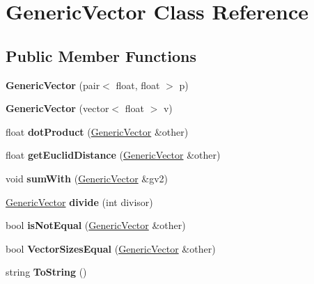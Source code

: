 \hypertarget{classGenericVector}{}\section{Generic\+Vector Class Reference}
\label{classGenericVector}
\subsection*{Public Member Functions}
\begin{DoxyCompactItemize}
\item 
\mbox{\label{classGenericVector_a95df0a51a505c9b6b864993d1979b95b}} 
{\bfseries Generic\+Vector} (pair$<$ float, float $>$ p)
\item 
\mbox{\label{classGenericVector_abf78215cf06a38dd61c627684a45524b}} 
{\bfseries Generic\+Vector} (vector$<$ float $>$ v)
\item 
\mbox{\label{classGenericVector_a994ddf14b55ac6e9333d676cbb9a5278}} 
float {\bfseries dot\+Product} (\hyperlink{classGenericVector}{Generic\+Vector} \&other)
\item 
\mbox{\label{classGenericVector_a26331bc15f84f065b762b19d9e725106}} 
float {\bfseries get\+Euclid\+Distance} (\hyperlink{classGenericVector}{Generic\+Vector} \&other)
\item 
\mbox{\label{classGenericVector_acf8ce1f677921e004ab98abca13d60e9}} 
void {\bfseries sum\+With} (\hyperlink{classGenericVector}{Generic\+Vector} \&gv2)
\item 
\mbox{\label{classGenericVector_af6f9eafb78d6ad371aa3397dac484c2e}} 
\hyperlink{classGenericVector}{Generic\+Vector} {\bfseries divide} (int divisor)
\item 
\mbox{\label{classGenericVector_a21c1f751fc162ea0bf6bccfad7fa4afa}} 
bool {\bfseries is\+Not\+Equal} (\hyperlink{classGenericVector}{Generic\+Vector} \&other)
\item 
\mbox{\label{classGenericVector_a38a8455e8c908b9a0026087a8a5f66ac}} 
bool {\bfseries Vector\+Sizes\+Equal} (\hyperlink{classGenericVector}{Generic\+Vector} \&other)
\item 
\mbox{\label{classGenericVector_a20588c7f40fe6a53899c952dd3dc2285}} 
string {\bfseries To\+String} ()
\end{DoxyCompactItemize}

